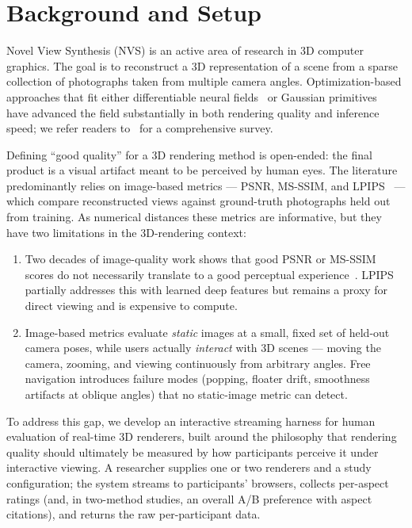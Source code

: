 
\section{Background and Setup}
\label{sec:background}

Novel View Synthesis (NVS) is an active area of research in 3D computer
graphics. The goal is to reconstruct a 3D representation of a scene from
a sparse collection of photographs taken from multiple camera angles.
Optimization-based approaches that fit either differentiable neural
fields~\citep{mildenhall2020nerf,mueller2022instantngp} or Gaussian
primitives~\citep{kerbl20233dgs} have advanced the field substantially
in both rendering quality and inference speed; we refer readers
to~\citet{tewari2022nrsurvey} for a comprehensive survey.

Defining ``good quality'' for a 3D rendering method is open-ended: the
final product is a visual artifact meant to be perceived by human eyes.
The literature predominantly relies on image-based metrics --- PSNR,
MS-SSIM, and LPIPS~\citep{zhang2018lpips} --- which compare reconstructed
views against ground-truth photographs held out from training. As
numerical distances these metrics are informative, but they have two
limitations in the 3D-rendering context:
\begin{enumerate}
    \item Two decades of image-quality work shows that good PSNR or
    MS-SSIM scores do not necessarily translate to a good perceptual
    experience~\citep{wang2009mse}. LPIPS partially addresses this with
    learned deep features but remains a proxy for direct viewing and is
    expensive to compute.
    \item Image-based metrics evaluate \emph{static} images at a small,
    fixed set of held-out camera poses, while users actually
    \emph{interact} with 3D scenes --- moving the camera, zooming, and
    viewing continuously from arbitrary angles. Free navigation
    introduces failure modes (popping, floater drift, smoothness
    artifacts at oblique angles) that no static-image metric can detect.
\end{enumerate}

To address this gap, we develop an interactive streaming harness for
human evaluation of real-time 3D renderers, built around the
philosophy that rendering quality should ultimately be measured by how
participants perceive it under interactive viewing. A researcher
supplies one or two renderers and a study configuration; the system
streams to participants' browsers, collects per-aspect ratings (and,
in two-method studies, an overall A/B preference with aspect
citations), and returns the raw per-participant data.

